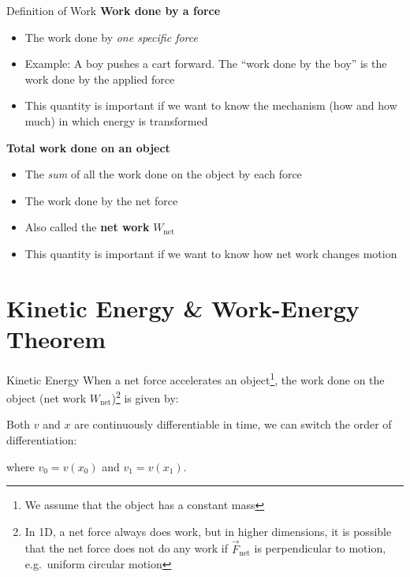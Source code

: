 \documentclass[12pt,compress,aspectratio=169]{beamer}
\begin{document}
\begin{frame}{Definition of Work}
  \textbf{Work done by a force}
  \begin{itemize}
  \item The work done by \emph{one specific force}
  \item Example: A boy pushes a cart forward. The ``work done by the boy'' is
    the work done by the applied force
  \item This quantity is important if we want to know the mechanism (how and
    how much) in which energy is transformed
  \end{itemize}

  \vspace{.15in}\textbf{Total work done on an object}
  \begin{itemize}
  \item The \emph{sum} of all the work done on the object by each force
  \item The work done by the net force
  \item Also called the \textbf{net work} $W_\text{net}$
  \item This quantity is important if we want to know how net work changes
    motion
  \end{itemize}
\end{frame}



\section{Kinetic Energy \& Work-Energy Theorem}

\begin{frame}{Kinetic Energy}
  When a net force accelerates an object\footnote{We assume that the object has
  a constant mass}, the work done on the object (net work
  $W_\text{net}$)\footnote{In 1D, a net force always does work, but in higher
  dimensions, it is possible that the net force does not do any work if
  $\vec F_\text{net}$ is perpendicular to motion, e.g.\ uniform circular motion}
  is given by:


  Both $v$ and $x$ are continuously differentiable in time, we can switch the
  order of differentiation:
  
  where $v_0=v(x_0)$ and $v_1=v(x_1)$.
  \vspace{.2in}
\end{frame}
\end{document}
